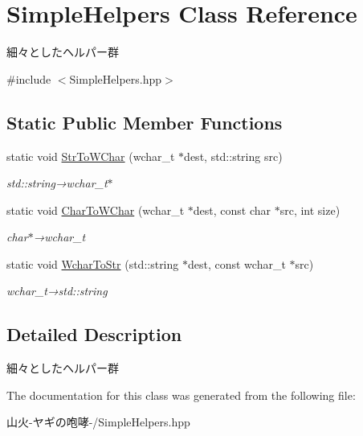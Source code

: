 \hypertarget{class_simple_helpers}{}\section{Simple\+Helpers Class Reference}
\label{class_simple_helpers}


細々としたヘルパー群  




{\ttfamily \#include $<$Simple\+Helpers.\+hpp$>$}

\subsection*{Static Public Member Functions}
\begin{DoxyCompactItemize}
\item 
static void \hyperlink{class_simple_helpers_a95d76cd081f5ae8ea42bdac226baadf3}{Str\+To\+W\+Char} (wchar\+\_\+t $\ast$dest, std\+::string src)\hypertarget{class_simple_helpers_a95d76cd081f5ae8ea42bdac226baadf3}{}\label{class_simple_helpers_a95d76cd081f5ae8ea42bdac226baadf3}

\begin{DoxyCompactList}\small\item\em std\+::string→wchar\+\_\+t$\ast$ \end{DoxyCompactList}\item 
static void \hyperlink{class_simple_helpers_aae9ac643a4173341c7b2810c457e7bce}{Char\+To\+W\+Char} (wchar\+\_\+t $\ast$dest, const char $\ast$src, int size)\hypertarget{class_simple_helpers_aae9ac643a4173341c7b2810c457e7bce}{}\label{class_simple_helpers_aae9ac643a4173341c7b2810c457e7bce}

\begin{DoxyCompactList}\small\item\em char$\ast$→wchar\+\_\+t \end{DoxyCompactList}\item 
static void \hyperlink{class_simple_helpers_a18900488c9865b3414af9fdc261f9f7c}{Wchar\+To\+Str} (std\+::string $\ast$dest, const wchar\+\_\+t $\ast$src)\hypertarget{class_simple_helpers_a18900488c9865b3414af9fdc261f9f7c}{}\label{class_simple_helpers_a18900488c9865b3414af9fdc261f9f7c}

\begin{DoxyCompactList}\small\item\em wchar\+\_\+t→std\+::string \end{DoxyCompactList}\end{DoxyCompactItemize}


\subsection{Detailed Description}
細々としたヘルパー群 

The documentation for this class was generated from the following file\+:\begin{DoxyCompactItemize}
\item 
山火-\/ヤギの咆哮-\//Simple\+Helpers.\+hpp\end{DoxyCompactItemize}
